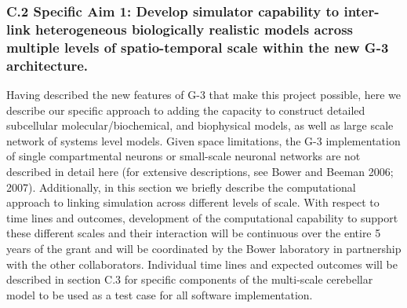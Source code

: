 \documentclass[12pt]{article}
\begin{document}
\subsubsection*{C.2 Specific Aim 1: Develop simulator capability to inter-link heterogeneous biologically realistic models across multiple levels of spatio-temporal scale within the new G-3 architecture.}

\noindent Having described the new features of G-3 that make this
project possible, here we describe our specific
approach to adding the capacity to construct detailed subcellular
molecular/biochemical, and biophysical models, as well as large scale
network of systems level models. Given
space limitations, the G-3 implementation of
single compartmental neurons or small-scale neuronal networks are not described in detail here (for extensive descriptions, see Bower and Beeman 2006; 2007). Additionally, in this section
we briefly describe the computational approach to linking simulation across
different levels of scale.  With respect to time lines and outcomes,
development of the computational capability to support these different scales 
and their interaction will be continuous over the
entire 5 years of the grant and will be coordinated by the Bower
laboratory in partnership with the other collaborators. Individual
time lines and expected outcomes will be described in section C.3 for
specific components of the multi-scale cerebellar model to be
used as a test case for all software implementation.
\end{document}
